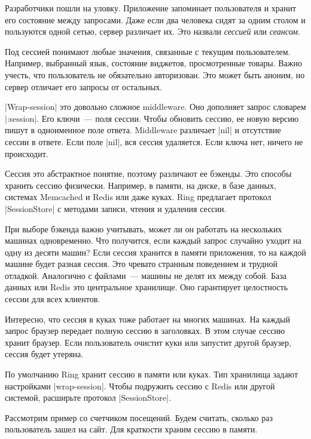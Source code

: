Разработчики пошли на уловку. Приложение запоминает пользователя и хранит его
состояние между запросами. Даже если два человека сидят за одним столом и
пользуются одной сетью, сервер различает их. Это назвали \emph{сессией} или
\emph{сеансом}.

Под сессией понимают любые значения, связанные с текущим
пользователем. Например, выбранный язык, состояние виджетов, просмотренные
товары. Важно учесть, что пользователь не обязательно авторизован. Это может
быть аноним, но сервер отличает его запросы от остальных.

\spverb|Wrap-session| это довольно сложное middleware. Оно дополняет запрос
словарем \spverb|:session|. Его ключи~--- поля сессии. Чтобы обновить сессию, ее
новую версию пишут в одноименное поле ответа. Middleware различает \spverb|nil|
и отсутствие сессии в ответе. Если поле \spverb|nil|, вся сессия удаляется. Если
ключа нет, ничего не происходит.

Сессия это абстрактное понятие, поэтому различают ее бэкенды. Это способы
хранить сессию физически. Например, в памяти, на диске, в базе данных, системах
Memcached и Redis или даже куках. Ring предлагает протокол \spverb|SessionStore|
с методами записи, чтения и удаления сессии.

При выборе бэкенда важно учитывать, может ли он работать на нескольких машинах
одновременно. Что получится, если каждый запрос случайно уходит на одну из
десяти машин? Если сессия хранится в памяти приложения, то на каждой машине
будет разная сессия. Это чревато странным поведением и трудной
отладкой. Аналогично с файлами~--- машины не делят их между собой. База данных
или Redis это центральное хранилище. Оно гарантирует целостность сессии для всех
клиентов.

Интересно, что сессия в куках тоже работает на многих машинах. На каждый запрос
браузер передает полную сессию в заголовках. В этом случае сессию хранит
браузер. Если пользователь очистит куки или запустит другой браузер, сессия
будет утеряна.

По умолчанию Ring хранит сессию в памяти или куках. Тип хранилища задают
настройками \spverb|wrap-session|. Чтобы подружить сессию с Redis или другой
системой, расширьте протокол \spverb|SessionStore|.

Рассмотрим пример со счетчиком посещений. Будем считать, сколько раз
пользователь зашел на сайт. Для краткости храним сессию в памяти.


\begin{english}
\end{english}

